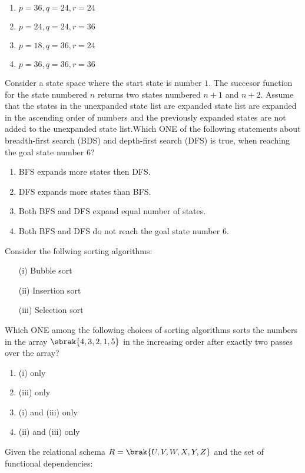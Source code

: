   \begin{enumerate}
      \item $p=36,q=24,r=24$
      \item $p=24,q=24,r=36$
      \item $p=18,q=36,r=24$
      \item $p=36,q=36,r=36$
  \end{enumerate}
  \item Consider a state space where the start state is number $1$. The succesor function for the state numbered $n$ returns two states numbered $n+1$ and $n+2$. Assume that the states in the unexpanded state list are expanded state list are expanded in the ascending order of numbers and the previously expanded states are not added to the unexpanded state list.Which ONE of the following statements about breadth-first search (BDS) and depth-first search (DFS) is true, when reaching the goal state number $6$?
  \begin{enumerate}
      \item BFS expands more states then DFS.
      \item DFS expands more states than BFS.
      \item Both BFS and DFS expand equal number of states.
      \item Both BFS and DFS  do not reach the goal state number $6$.
  \end{enumerate}
  \item Consider the follwing sorting algorithms:\\
  \begin{enumerate}
      \item[(i)] Bubble sort
      \item[(ii)] Insertion sort
      \item[(iii)] Selection sort\\
  \end{enumerate}
  Which ONE among the following choices of sorting algorithms sorts the numbers in the array $\sbrak{4,3,2,1,5}$ in the increasing order after exactly two passes over the array?
  \begin{enumerate}
      \item (i) only
      \item (iii) only
      \item (i) and (iii) only
      \item (ii) and (iii) only
  \end{enumerate}
  \item Given the relational schema $R=\brak{U,V,W,X,Y,Z}$ and the set of functional dependencies:\\
